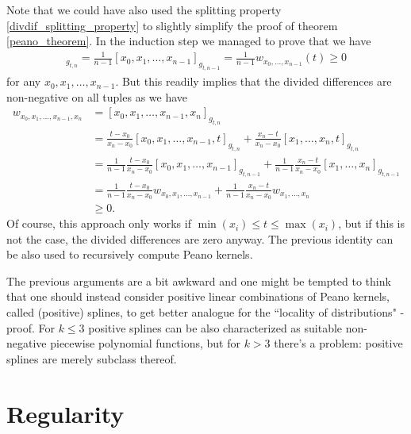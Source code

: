 Note that we could have also used the splitting property \ref{divdif_splitting_property} to slightly simplify the proof of theorem \ref{peano_theorem}. In the induction step we managed to prove that we have
\begin{align*}
	[x_{0}, x_{1}, \ldots, x_{n - 1}, t]_{g_{t, n}} = \frac{1}{n - 1}[x_{0}, x_{1}, \ldots, x_{n - 1}]_{g_{t, n - 1}} =  \frac{1}{n - 1} w_{x_{0}, \ldots, x_{n - 1}}(t)\geq 0
\end{align*}
for any $x_{0}, x_{1}, \ldots, x_{n - 1}$. But this readily implies that the divided differences are non-negative on all tuples as we have
\begin{align*}
	w_{x_{0}, x_{1}, \ldots, x_{n - 1}, x_{n}} &= [x_{0}, x_{1}, \ldots, x_{n - 1}, x_{n}]_{g_{t, n}} \\
	&= \frac{t - x_{0}}{x_{n} - x_{0}} [x_{0}, x_{1}, \ldots, x_{n - 1}, t]_{g_{t, n}} + \frac{x_{n} - t}{x_{n} - x_{0}} [x_{1}, \ldots, x_{n}, t]_{g_{t, n}} \\
	&= \frac{1}{n - 1} \frac{t - x_{0}}{x_{n} - x_{0}} [x_{0}, x_{1}, \ldots, x_{n - 1}]_{g_{t, n - 1}} + \frac{1}{n - 1}\frac{x_{n} - t}{x_{n} - x_{0}} [x_{1}, \ldots, x_{n}]_{g_{t, n - 1}} \\
	&= \frac{1}{n - 1}  \frac{t - x_{0}}{x_{n} - x_{0}} w_{x_{0}, x_{1}, \ldots, x_{n - 1}} + \frac{1}{n - 1}\frac{x_{n} - t}{x_{n} - x_{0}} w_{x_{1}, \ldots, x_{n}} \\
	&\geq 0.
\end{align*}
Of course, this approach only works if $\min(x_{i}) \leq t \leq \max(x_{i})$, but if this is not the case, the divided differences are zero anyway. The previous identity can be also used to recursively compute Peano kernels.

\begin{huom}
	The previous arguments are a bit awkward and one might be tempted to think that one should instead consider positive linear combinations of Peano kernels, called (positive) splines, to get better analogue for the ``locality of distributions" -proof. For $k \leq 3$ positive splines can be also characterized as suitable non-negative piecewise polynomial functions, but for $k > 3$ there's a problem: positive splines are merely subclass thereof.
\end{huom}

\section{Regularity}

